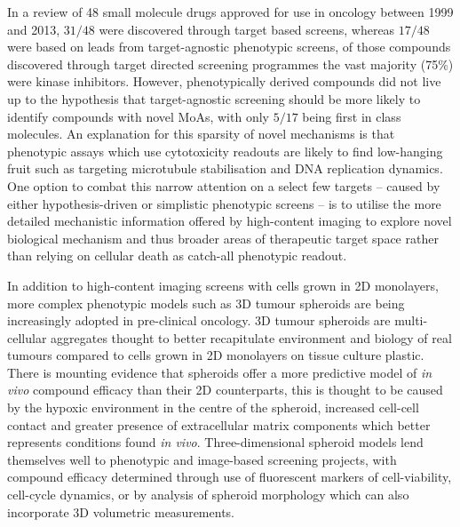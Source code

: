 \documentclass[a4paper,11pt,twoside,openright]{scrbook}
\begin{document}
In a review of 48 small molecule drugs approved for use in oncology between 1999 and 2013, $31/48$ were discovered through target based screens, whereas $17/48$ were based on leads from target-agnostic phenotypic screens, \cite{Moffat2014} of those compounds discovered through target directed screening programmes the vast majority (75\%) were kinase inhibitors.
However, phenotypically derived compounds did not live up to the hypothesis that target-agnostic screening should be more likely to identify compounds with novel MoAs, \cite{Swinney2011} with only $5/17$ being first in class molecules.
An explanation for this sparsity of novel mechanisms is that phenotypic assays which use cytotoxicity readouts are likely to find low-hanging fruit such as targeting microtubule stabilisation and DNA replication dynamics. \cite{Moffat2014}
One option to combat this narrow attention on a select few targets -- caused by either hypothesis-driven or simplistic phenotypic screens -- is to utilise the more detailed mechanistic information offered by high-content imaging to explore novel biological mechanism and thus broader areas of therapeutic target space rather than relying on cellular death as catch-all phenotypic readout.

In addition to high-content imaging screens with cells grown in 2D monolayers, more complex phenotypic models such as 3D tumour spheroids are being increasingly adopted in pre-clinical oncology.
3D tumour spheroids are multi-cellular aggregates thought to better recapitulate environment and biology of real tumours compared to cells grown in 2D monolayers on tissue culture plastic.
There is mounting evidence that spheroids offer a more predictive model of \textit{in vivo} compound efficacy than their 2D counterparts, \cite{Pickl2009, Breslin2013,Lovitt2013} this is thought to be caused by the hypoxic environment in the centre of the spheroid, increased cell-cell contact and greater presence of extracellular matrix components which better represents conditions found \textit{in vivo}.
Three-dimensional spheroid models lend themselves well to phenotypic and image-based screening projects, with compound efficacy determined through use of fluorescent markers of cell-viability, \cite{Lovitt2013} cell-cycle dynamics, \cite{Laurent2013} or by analysis of spheroid morphology which can also incorporate 3D volumetric measurements. \cite{Huang2017}
\end{document}
